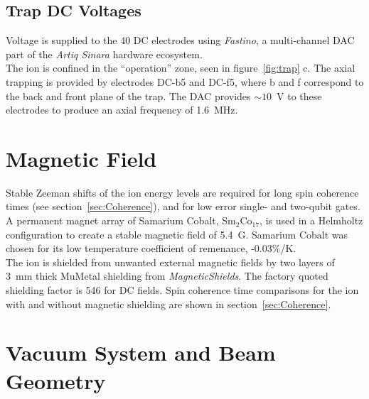 \subsection{Trap DC Voltages}

    Voltage is supplied to the 40 DC electrodes using \emph{Fastino}, a
    multi-channel DAC part of the \emph{Artiq Sinara} hardware
    ecosystem.\\
    The ion is confined in the ``operation'' zone, seen in
    figure~\ref{fig:trap} c. The axial trapping is provided by electrodes
    DC-b5 and DC-f5, where b and f correspond to the back and front plane of the trap. 
    The DAC provides $\sim 10$~V to these electrodes to produce an axial frequency of 1.6~MHz.
 
\section{Magnetic Field}
\label{sec:Magnetic Field}
    Stable Zeeman shifts of the ion energy levels are required for long spin
    coherence times (see section~\ref{sec:Coherence}), and for low error single-
    and two-qubit gates. A permanent magnet array of Samarium Cobalt,
    Sm$_2$Co$_17$, is used in a Helmholtz configuration to create a stable magnetic
    field of 5.4~G. Samarium Cobalt was chosen for its low temperature
    coefficient of remenance, -0.03\%/K.\\
    The ion is shielded from unwanted external magnetic fields by two layers of
    3~mm thick MuMetal shielding from \emph{MagneticShields}. The factory quoted
    shielding factor is 546 for DC fields. Spin coherence time comparisons for
    the ion with and without magnetic shielding are shown in
    section~\ref{sec:Coherence}.\\

\section{Vacuum System and Beam Geometry}
\label{sec:Vacuum System}


